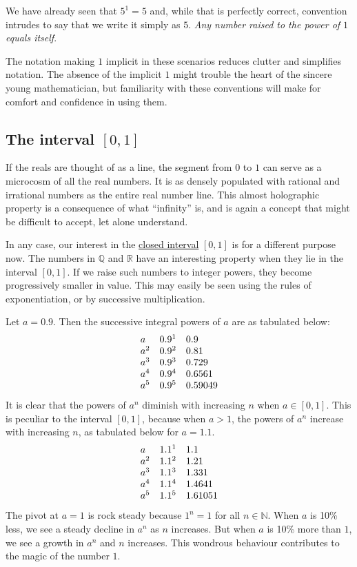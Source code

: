 \documentclass[
  a4paper,
]{article}
\begin{document}
We have already seen that \(5^1 = 5\) and, while that is perfectly
correct, convention intrudes to say that we write it simply as \(5\).
\emph{Any number raised to the power of \(1\) equals itself}.

The notation making \(1\) implicit in these scenarios reduces clutter
and simplifies notation. The absence of the implicit \(1\) might trouble
the heart of the sincere young mathematician, but familiarity with these
conventions will make for comfort and confidence in using them.

\hypertarget{the-interval-0-1}{%
\subsection{\texorpdfstring{The interval
\([0, 1]\)}{The interval {[}0, 1{]}}}\label{the-interval-0-1}}

If the reals are thought of as a line, the segment from \(0\) to \(1\)
can serve as a microcosm of all the real numbers. It is as densely
populated with rational and irrational numbers as the entire real number
line. This almost holographic property is a consequence of what
``infinity'' is, and is again a concept that might be difficult to
accept, let alone understand.

In any case, our interest in the
\href{https://mathworld.wolfram.com/ClosedInterval.html}{closed
interval} \([0, 1]\) is for a different purpose now. The numbers in
\(\mathbb{Q}\) and \(\mathbb{R}\) have an interesting property when they
lie in the interval \([0, 1]\). If we raise such numbers to integer
powers, they become progressively smaller in value. This may easily be
seen using the rules of exponentiation, or by successive multiplication.

Let \(a = 0.9\). Then the successive integral powers of \(a\) are as
tabulated below: \[
\begin{array}{l  r  l}
a & 0.9^1 & 0.9\\
a^2 & 0.9^2 & 0.81\\
a^3 & 0.9^3 & 0.729\\
a^4 & 0.9^4 & 0.6561\\
a^5 & 0.9^5 & 0.59049\\
\end{array}
\] It is clear that the powers of \(a^n\) diminish with increasing \(n\)
when \(a \in [0, 1]\). This is peculiar to the interval \([0, 1]\),
because when \(a > 1\), the powers of \(a^n\) increase with increasing
\(n\), as tabulated below for \(a=1.1\). \[
\begin{array}{l  r  l}
a & 1.1^1 & 1.1\\
a^2 & 1.1^2 & 1.21\\
a^3 & 1.1^3 & 1.331\\
a^4 & 1.1^4 & 1.4641\\
a^5 & 1.1^5 & 1.61051\\
\end{array}
\] The pivot at \(a = 1\) is rock steady because \(1^n = 1\) for all
\(n \in \mathbb{N}\). When \(a\) is 10\% less, we see a steady decline
in \(a^n\) as \(n\) increases. But when \(a\) is 10\% more than \(1\),
we see a growth in \(a^n\) and \(n\) increases. This wondrous behaviour
contributes to the magic of the number \(1\).
\end{document}
